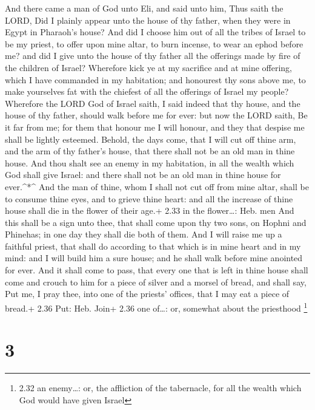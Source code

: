  And there came a man of God unto Eli, and said unto him,
Thus saith the LORD, Did I plainly appear unto the house of thy father,
when they were in Egypt in Pharaoh's house?  And did I
choose him out of all the tribes of Israel to be my priest, to offer
upon mine altar, to burn incense, to wear an ephod before me? and did I
give unto the house of thy father all the offerings made by fire of the
children of Israel?  Wherefore kick ye at my sacrifice and
at mine offering, which I have commanded in my habitation; and honourest
thy sons above me, to make yourselves fat with the chiefest of all the
offerings of Israel my people?  Wherefore the LORD God of
Israel saith, I said indeed that thy house, and the house of thy father,
should walk before me for ever: but now the LORD saith, Be it far from
me; for them that honour me I will honour, and they that despise me
shall be lightly esteemed.  Behold, the days come, that I
will cut off thine arm, and the arm of thy father's house, that there
shall not be an old man in thine house.  And thou shalt see
an enemy in my habitation, in all the wealth which God shall give
Israel: and there shall not be an old man in thine house for
ever.\^{}*\^{}  And the man of thine, whom I shall not cut
off from mine altar, shall be to consume thine eyes, and to grieve thine
heart: and all the increase of thine house shall die in the flower of
their age.+ 2.33 in the flower\ldots: Heb. men  And this
shall be a sign unto thee, that shall come upon thy two sons, on Hophni
and Phinehas; in one day they shall die both of them.  And
I will raise me up a faithful priest, that shall do according to that
which is in mine heart and in my mind: and I will build him a sure
house; and he shall walk before mine anointed for ever. 
And it shall come to pass, that every one that is left in thine house
shall come and crouch to him for a piece of silver and a morsel of
bread, and shall say, Put me, I pray thee, into one of the priests'
offices, that I may eat a piece of bread.+ 2.36 Put: Heb. Join+ 2.36 one
of\ldots: or, somewhat about the priesthood \footnote{2.32 an
  enemy\ldots: or, the affliction of the tabernacle, for all the wealth
  which God would have given Israel}

\hypertarget{section-2}{%
\section{3}\label{section-2}}

